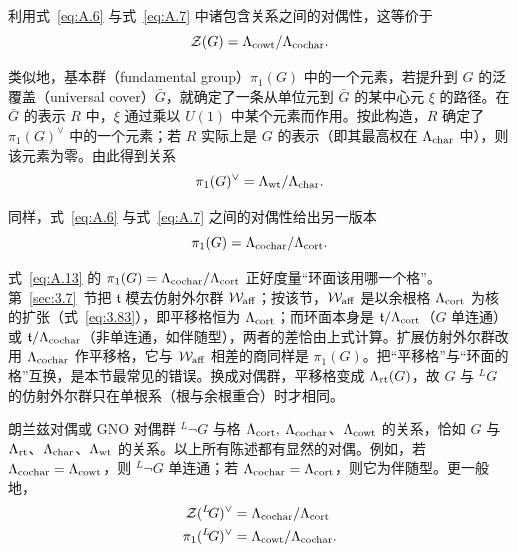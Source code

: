 利用式~\eqref{eq:A.6} 与式~\eqref{eq:A.7} 中诸包含关系之间的对偶性，这等价于
\setcounter{equation}{10}
\begin{equation}\label{eq:A.11}
  {\mathcal Z}(G)=\Lambda_{\rm cowt}/\Lambda_{\rm cochar}.
\end{equation}

类似地，基本群（fundamental group）$\pi_1(G)$ 中的一个元素，若提升到 $G$ 的泛覆盖（universal cover）$\bar G$，就确定了一条从单位元到 $\bar G$ 的某中心元 $\xi$ 的路径。在 $\bar G$ 的表示 $R$ 中，$\xi$ 通过乘以 $U(1)$ 中某个元素而作用。按此构造，$R$ 确定了 $\pi_1(G)^\vee$ 中的一个元素；若 $R$ 实际上是 $G$ 的表示（即其最高权在 $\Lambda_{\rm char}$ 中），则该元素为零。由此得到关系
\setcounter{equation}{11}
\begin{equation}\label{eq:A.12}
  \pi_1(G)^\vee=\Lambda_{\rm wt}/\Lambda_{\rm char}.
\end{equation}

同样，式~\eqref{eq:A.6} 与式~\eqref{eq:A.7} 之间的对偶性给出另一版本
\setcounter{equation}{12}
\begin{equation}\label{eq:A.13}
  \pi_1(G)=\Lambda_{\rm cochar}/\Lambda_{\rm cort}.
\end{equation}

\begin{yizhu}[物理图像补充]
式~\eqref{eq:A.13} 的 $\pi_1(G)=\Lambda_{\rm cochar}/\Lambda_{\rm cort}$ 正好度量“环面该用哪一个格”。第~\ref{sec:3.7}~节把 $\mathfrak t$ 模去仿射外尔群 ${\mathcal W}_{\rm aff}$；按该节，${\mathcal W}_{\rm aff}$ 是以余根格 $\Lambda_{\rm cort}$ 为核的扩张（式~\eqref{eq:3.83}），即平移格恒为 $\Lambda_{\rm cort}$；而环面本身是 $\mathfrak t/\Lambda_{\rm cort}$（$G$ 单连通）或 $\mathfrak t/\Lambda_{\rm cochar}$（非单连通，如伴随型），两者的差恰由上式计算。扩展仿射外尔群改用 $\Lambda_{\rm cochar}$ 作平移格，它与 ${\mathcal W}_{\rm aff}$ 相差的商同样是 $\pi_1(G)$。把“平移格”与“环面的格”互换，是本节最常见的错误。换成对偶群，平移格变成 $\Lambda_{\rm rt}(G)$，故 $G$ 与 $^LG$ 的仿射外尔群只在单根系（根与余根重合）时才相同。
\end{yizhu}

朗兰兹对偶或 GNO 对偶群 $^L\neg G$ 与格 $\Lambda_{\rm cort},$ $\Lambda_{\rm cochar}$、$\Lambda_{\rm cowt}$ 的关系，恰如 $G$ 与 $\Lambda_{\rm rt}$、$\Lambda_{\rm char}$、$\Lambda_{\rm wt}$ 的关系。以上所有陈述都有显然的对偶。例如，若 $\Lambda_{\rm cochar}=\Lambda_{\rm cowt}$，则 $^L\neg G$ 单连通；若 $\Lambda_{\rm cochar}=\Lambda_{\rm cort}$，则它为伴随型。更一般地，
\setcounter{equation}{13}
\begin{equation}\label{eq:A.14}
  \begin{aligned}
{\mathcal Z}({}^L\negthinspace G)^\vee&=\Lambda_{\rm cochar}/\Lambda_{\rm cort}\\
\pi_1({}^L\negthinspace G)^\vee& = \Lambda_{\rm cowt}/\Lambda_{\rm cochar}.\end{aligned}
\end{equation}

